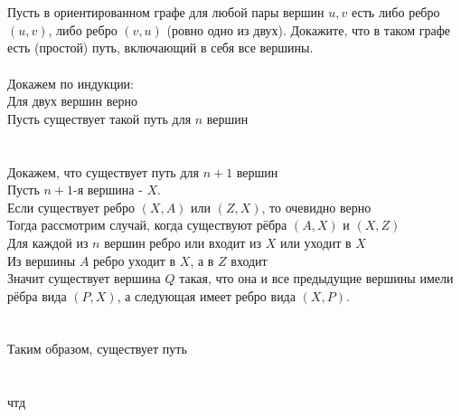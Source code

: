 \documentclass{article}
\begin{document}
\section{}
Пусть в ориентированном графе для любой пары вершин $u, v$ есть либо ребро $(u,v)$, либо ребро $(v,u)$ (ровно одно из двух). Докажите, что в таком графе есть (простой) путь, включающий в себя все вершины.\\\\
Докажем по индукции:\\
Для двух вершин верно\\
Пусть существует такой путь для $n$ вершин\\
\\\\
Докажем, что существует путь для $n+1$ вершин\\
Пусть $n+1$-я вершина - $X$.\\
Если существует ребро $(X,A)$ или $(Z,X)$, то очевидно верно\\
Тогда рассмотрим случай, когда существуют рёбра $(A,X)$ и $(X,Z)$\\
Для каждой из $n$ вершин ребро или входит из $X$ или уходит в $X$\\
Из вершины $A$ ребро уходит в $X$, а в $Z$ входит\\
Значит существует вершина $Q$ такая, что она и все предыдущие вершины имели рёбра вида $(P,X)$, а следующая имеет ребро вида $(X,P)$.\\
\\\\
Таким образом, существует путь \\
\\\\
чтд
\end{document}
